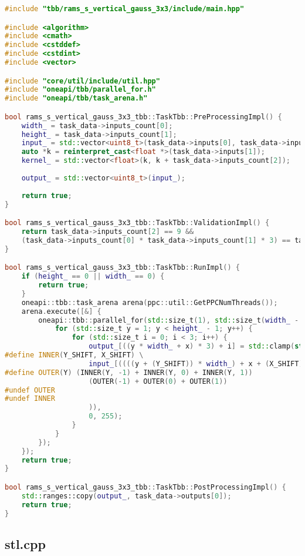 \documentclass[12pt]{article}
\begin{document}
\begin{lstlisting}[language=C++]
#include "tbb/rams_s_vertical_gauss_3x3/include/main.hpp"

#include <algorithm>
#include <cmath>
#include <cstddef>
#include <cstdint>
#include <vector>

#include "core/util/include/util.hpp"
#include "oneapi/tbb/parallel_for.h"
#include "oneapi/tbb/task_arena.h"

bool rams_s_vertical_gauss_3x3_tbb::TaskTbb::PreProcessingImpl() {
	width_ = task_data->inputs_count[0];
	height_ = task_data->inputs_count[1];
	input_ = std::vector<uint8_t>(task_data->inputs[0], task_data->inputs[0] + (height_ * width_ * 3));
	auto *k = reinterpret_cast<float *>(task_data->inputs[1]);
	kernel_ = std::vector<float>(k, k + task_data->inputs_count[2]);
	
	output_ = std::vector<uint8_t>(input_);
	
	return true;
}

bool rams_s_vertical_gauss_3x3_tbb::TaskTbb::ValidationImpl() {
	return task_data->inputs_count[2] == 9 &&
	(task_data->inputs_count[0] * task_data->inputs_count[1] * 3) == task_data->outputs_count[0];
}

bool rams_s_vertical_gauss_3x3_tbb::TaskTbb::RunImpl() {
	if (height_ == 0 || width_ == 0) {
		return true;
	}
	oneapi::tbb::task_arena arena(ppc::util::GetPPCNumThreads());
	arena.execute([&] {
		oneapi::tbb::parallel_for(std::size_t(1), std::size_t(width_ - 1), [&](std::size_t x) {
			for (std::size_t y = 1; y < height_ - 1; y++) {
				for (std::size_t i = 0; i < 3; i++) {
					output_[((y * width_ + x) * 3) + i] = std::clamp(static_cast<int>(std::round(
#define INNER(Y_SHIFT, X_SHIFT) \
					input_[((((y + (Y_SHIFT)) * width_) + x + (X_SHIFT)) * 3) + i] * kernel_[4 + (3 * (Y_SHIFT)) + (X_SHIFT)]
#define OUTER(Y) (INNER(Y, -1) + INNER(Y, 0) + INNER(Y, 1))
					(OUTER(-1) + OUTER(0) + OUTER(1))
#undef OUTER
#undef INNER
					)),
					0, 255);
				}
			}
		});
	});
	return true;
}

bool rams_s_vertical_gauss_3x3_tbb::TaskTbb::PostProcessingImpl() {
	std::ranges::copy(output_, task_data->outputs[0]);
	return true;
}
\end{lstlisting}

\subsection{stl.cpp}
\end{document}
